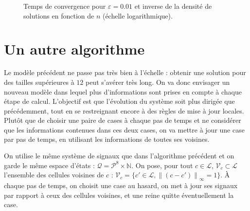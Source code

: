 \documentclass[11pt, openany]{article}
\newcommand{\N}{\mathbb{N}}
\newcommand{\norm}[1]{\left\lVert#1\right\rVert}
\newcommand{\La}{\mathcal{L}}
\newcommand{\V}{\mathcal V}
\begin{document}
\begin{figure}
  \centering

  \caption{Temps de convergence pour $\varepsilon=0.01$ et inverse de la densité de solutions en fonction de $n$  (échelle logarithmique).}
\end{figure} 


\section*{Un autre algorithme}

Le modèle précédent ne passe pas très bien à l'échelle : obtenir une solution pour des tailles supérieures à $12$ peut s'avérer très long. On va donc envisager un nouveau modèle dans lequel plus d'informations sont prises en compte à chaque étape de calcul. L'objectif est que l'évolution du système soit plus dirigée que précédemment, tout en se restreignant encore à des règles de mise à jour locales. Plutôt que de choisir une paire de cases à chaque pas de temps et ne considérer que les informations contenues dans ces deux cases, on va mettre à jour une case par pas de temps, en utilisant les informations de toutes ses voisines. 

On utilise le même système de signaux que dans l'algorithme précédent et on garde le même espace d'états : $\mathcal{Q} = {\mathcal{P}^8}\times\N$. On pose, pour tout $c\in\La$, $\V_c\subset\La$ l'ensemble des cellules voisines de $c$ : $\V_c = \{c' \in \La, \norm{(c-c')}_\infty = 1\}$.
À chaque pas de temps, on choisit une case au hasard, on met à jour ses signaux par rapport à ceux des cellules voisines, et une reine quitte éventuellement la case. 
\end{document}
